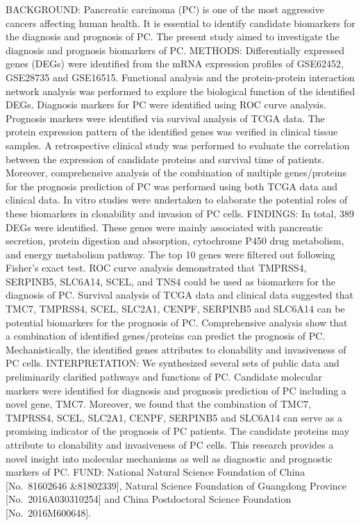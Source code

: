 \documentclass[]{article}
\begin{document}
BACKGROUND: Pancreatic carcinoma (PC) is one of the most aggressive
cancers affecting human health. It is essential to identify candidate
biomarkers for the diagnosis and prognosis of PC. The present study
aimed to investigate the diagnosis and prognosis biomarkers of PC.
METHODS: Differentially expressed genes (DEGs) were identified from the
mRNA expression profiles of GSE62452, GSE28735 and GSE16515. Functional
analysis and the protein-protein interaction network analysis was
performed to explore the biological function of the identified DEGs.
Diagnosis markers for PC were identified using ROC curve analysis.
Prognosis markers were identified via survival analysis of TCGA data.
The protein expression pattern of the identified genes was verified in
clinical tissue samples. A retrospective clinical study was performed to
evaluate the correlation between the expression of candidate proteins
and survival time of patients. Moreover, comprehensive analysis of the
combination of multiple genes/proteins for the prognosis prediction of
PC was performed using both TCGA data and clinical data. In vitro
studies were undertaken to elaborate the potential roles of these
biomarkers in clonability and invasion of PC cells. FINDINGS: In total,
389 DEGs were identified. These genes were mainly associated with
pancreatic secretion, protein digestion and absorption, cytochrome P450
drug metabolism, and energy metabolism pathway. The top 10 genes were
filtered out following Fisher's exact test. ROC curve analysis
demonstrated that TMPRSS4, SERPINB5, SLC6A14, SCEL, and TNS4 could be
used as biomarkers for the diagnosis of PC. Survival analysis of TCGA
data and clinical data suggested that TMC7, TMPRSS4, SCEL, SLC2A1,
CENPF, SERPINB5 and SLC6A14 can be potential biomarkers for the
prognosis of PC. Comprehensive analysis show that a combination of
identified genes/proteins can predict the prognosis of PC.
Mechanistically, the identified genes attributes to clonability and
invasiveness of PC cells. INTERPRETATION: We synthesized several sets of
public data and preliminarily clarified pathways and functions of PC.
Candidate molecular markers were identified for diagnosis and prognosis
prediction of PC including a novel gene, TMC7. Moreover, we found that
the combination of TMC7, TMPRSS4, SCEL, SLC2A1, CENPF, SERPINB5 and
SLC6A14 can serve as a promising indicator of the prognosis of PC
patients. The candidate proteins may attribute to clonability and
invasiveness of PC cells. This research provides a novel insight into
molecular mechanisms as well as diagnostic and prognostic markers of PC.
FUND: National Natural Science Foundation of China {[}No.~81602646
\&81802339{]}, Natural Science Foundation of Guangdong Province
{[}No.~2016A030310254{]} and China Postdoctoral Science Foundation
{[}No.~2016M600648{]}.
\end{document}
